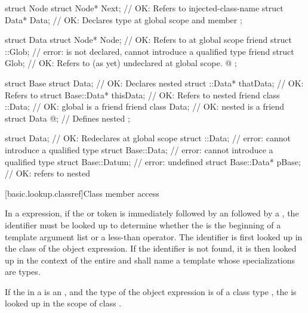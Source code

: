 \pnum
\begin{example}
\begin{codeblock}
struct Node {
  struct Node* Next;            // OK: Refers to injected-class-name 
  struct Data* Data;            // OK: Declares type  at global scope and member 
};

struct Data {
  struct Node* Node;            // OK: Refers to  at global scope
  friend struct ::Glob;         // error:  is not declared, cannot introduce a qualified type
  friend struct Glob;           // OK: Refers to (as yet) undeclared  at global scope.
  @\commentellip@
};

struct Base {
  struct Data;                  // OK: Declares nested 
  struct ::Data*     thatData;  // OK: Refers to 
  struct Base::Data* thisData;  // OK: Refers to nested 
  friend class ::Data;          // OK: global  is a friend
  friend class Data;            // OK: nested  is a friend
  struct Data { @\commentellip@ };    // Defines nested 
};

struct Data;                    // OK: Redeclares  at global scope
struct ::Data;                  // error: cannot introduce a qualified type
struct Base::Data;              // error: cannot introduce a qualified type
struct Base::Datum;             // error:  undefined
struct Base::Data* pBase;       // OK: refers to nested 
\end{codeblock}
\end{example}
%

[basic.lookup.classref]{Class member access}

\pnum
{}%
In a  expression, if the 
or \tcode{->} token is immediately followed by an 
followed by a \tcode{<}, the identifier must be looked up to determine
whether the \tcode{<} is the beginning of a template argument
list or a less-than operator. The identifier is first
looked up in the class of the object expression.
If the identifier is not found,
it is then looked up in the context of the entire
 and shall name a template
whose specializations are types.

\pnum
If the  in a  is an , and the type of
the object expression is of a class type , the
 is looked up
in the scope of class .

